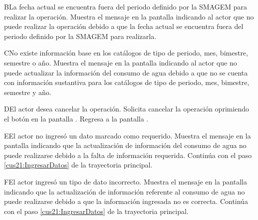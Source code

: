  \begin{UCtrayectoriaA}{B}{La fecha actual se encuentra fuera del periodo definido por la SMAGEM para realizar la operación.}
    \UCpaso[\UCsist] Muestra el mensaje  en la pantalla  indicando al actor que no puede realizar la operación debido a que la fecha actual se encuentra fuera del periodo definido por la SMAGEM para realizarla. 
 \end{UCtrayectoriaA}
 
  \begin{UCtrayectoriaA}{C}{No existe información base en los catálogos de tipo de periodo, mes, bimestre, semestre o año.}
    \UCpaso[\UCsist] Muestra el mensaje  en la pantalla  indicando al actor que no puede actualizar la información del consumo de agua debido a que no se cuenta con información sustantiva para los catálogos de tipo de periodo, mes, bimestre, semestre y año.
 \end{UCtrayectoriaA}
 
    \begin{UCtrayectoriaA}{D}{El actor desea cancelar la operación.}
    \UCpaso[\UCactor] Solicita cancelar la operación oprimiendo el botón  en la pantalla .
    \UCpaso[] Regresa a la pantalla . 
    \end{UCtrayectoriaA}
  
    \begin{UCtrayectoriaA}{E}{El actor no ingresó un dato marcado como requerido.}    
    \UCpaso[\UCsist] Muestra el mensaje  en la pantalla  indicando que la actualización de información del consumo de agua no puede realizarse debido a la falta de información requerida.
    \UCpaso[] Continúa con el paso \ref{cus21:IngresarDatos} de la trayectoria principal.     
    \end{UCtrayectoriaA}
 
        \begin{UCtrayectoriaA}{F}{El actor ingresó un tipo de dato incorrecto.}    
    \UCpaso[\UCsist] Muestra el mensaje  en la pantalla  indicando que la actualización de información referente al consumo de agua no puede realizarse debido a que la información ingresada no es correcta.
    \UCpaso[] Continúa con el paso \ref{cus21:IngresarDatos} de la trayectoria principal.     
    \end{UCtrayectoriaA}
    
